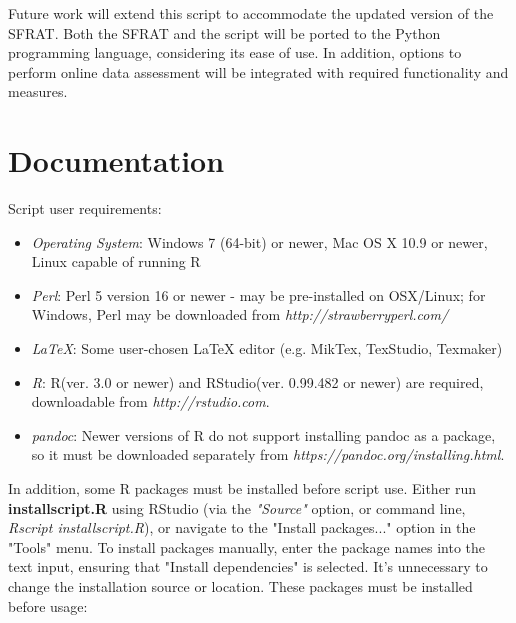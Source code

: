 \documentclass[conference]{IEEEtran}
\begin{document}
Future work will extend this script to accommodate the updated version of the SFRAT. Both the SFRAT and the script will be ported to the Python programming language, considering its ease of use. In addition, options to perform online data assessment will be integrated with required functionality and measures.

\section*{Documentation}\label{sec:Documentation}
Script user requirements:
\begin{itemize}
  \item {\textit{Operating System}: Windows 7 (64-bit) or newer, Mac OS X 10.9 or newer, Linux capable of running R}
  \item {\textit{Perl}: Perl 5 version 16 or newer - may be pre-installed on OSX/Linux; for Windows, Perl may be downloaded from \textit{http://strawberryperl.com/}}
  \item{\textit{LaTeX}: Some user-chosen LaTeX editor (e.g. MikTex, TexStudio, Texmaker)}
  \item {\textit{R}: R(ver. 3.0 or newer) and RStudio(ver. 0.99.482 or newer) are required, downloadable from \textit{http://rstudio.com}}.
   \item{\textit{pandoc}: Newer versions of R do not support installing pandoc as a package, so it must be downloaded separately from \textit{https://pandoc.org/installing.html}.}
\end{itemize}
In addition, some R packages must be installed before script use. Either run \textbf{installscript.R} using RStudio (via the \textit{"Source"} option, or command line, \textit{Rscript installscript.R}), or navigate to the "Install packages..." option in the "Tools" menu. To install packages manually, enter the package names into the text input, ensuring that "Install dependencies" is selected. It's unnecessary to change the installation source or location. These packages must be installed before usage:
\end{document}
